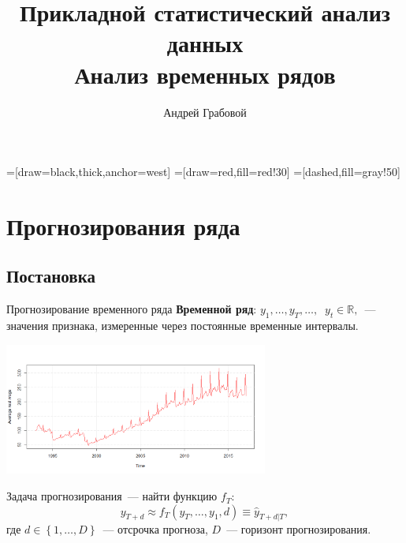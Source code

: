 \documentclass[9pt,pdf,utf8,hyperref={unicode},aspectratio=169]{beamer}
\title[Анализ временных рядов]{Прикладной статистический анализ данных\\ Анализ временных рядов}
\author{Андрей Грабовой}
\date{}
\begin{document}
=[draw=black,thick,anchor=west]
=[draw=red,fill=red!30]
=[dashed,fill=gray!50]

\begin{frame}
    \titlepage
\end{frame}

\section{Прогнозирования ряда}
\subsection{Постановка}
\begin{frame}{Прогнозирование временного ряда}
	\textbf{Временной ряд}: $y_1,\dots,y_T,\dots,\;\; y_t\in\mathbb{R},$~--- значения признака, измеренные через постоянные временные интервалы.
	
	\begin{center}
		\includegraphics[width=0.65\textwidth]{wage.png}
	\end{center}
	
	Задача прогнозирования~--- найти функцию $f_T\colon$
	$$y_{T+d} \approx f_T\left(y_T,\dots,y_1,d\right) \equiv \hat{y}_{T+d|T},$$
	где $d \in \left\{1,\dots,D\right\}$~--- отсрочка прогноза, $D$~--- горизонт прогнозирования.		
\end{frame}
\end{document}
